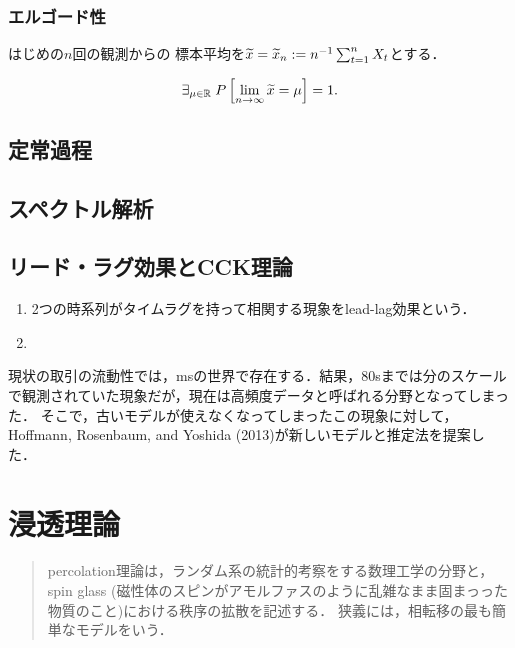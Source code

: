 \documentclass[uplatex,dvipdfmx]{jsreport}
\begin{document}
\subsection{エルゴード性}

\begin{notation}
    はじめの$n$回の観測からの
    標本平均を$\widetilde{x}=\widetilde{x}_n:=n^{-1}\sum^n_{t=1}X_t$とする．
\end{notation}

\begin{definition}
    \[\exists_{\mu\in\mathbb{R}}\;P\left[\lim_{n\to\infty}\widetilde{x}=\mu\right]=1.\]
\end{definition}

\section{定常過程}

\section{スペクトル解析}



\section{リード・ラグ効果とCCK理論}

\begin{definition}\mbox{}
    \begin{enumerate}
        \item 2つの時系列がタイムラグを持って相関する現象をlead-lag効果という．
        \item 
    \end{enumerate}
\end{definition}
\begin{remarks}
    現状の取引の流動性では，msの世界で存在する．結果，80sまでは分のスケールで観測されていた現象だが，現在は高頻度データと呼ばれる分野となってしまった．
    そこで，古いモデルが使えなくなってしまったこの現象に対して，Hoffmann, Rosenbaum, and Yoshida (2013)が新しいモデルと推定法を提案した．
    
\end{remarks}

\chapter{浸透理論}

\begin{quotation}
    percolation理論は，ランダム系の統計的考察をする数理工学の分野と，spin glass (磁性体のスピンがアモルファスのように乱雑なまま固まっった物質のこと)における秩序の拡散を記述する．
    狭義には，相転移の最も簡単なモデルをいう．
\end{quotation}
\end{document}
